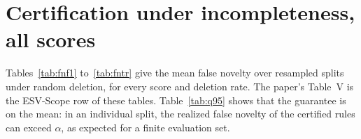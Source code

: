 \documentclass[10pt,a4paper]{article}
\theoremstyle{definition}
\theoremstyle{remark}
\newcommand{\open}{\textup{\textsc{open}}}
\newcommand{\closed}{\textup{\textsc{closed}}}
\begin{document}
\begin{table}[h]
\centering
\caption{The two passes over the SciFact test split (300 questions).}
\label{tab:runs}

\end{table}

\begin{table}[h]
\centering
\caption{Paired comparison on the test split, ESV-Learned minus baseline. $\Delta$F1 with paired bootstrap 95\% interval; McNemar counts of questions only ESV-Learned got right ($b$) and only the baseline got right ($c$).}
\label{tab:paired}

\end{table}

\begin{table}[h]
\centering
\caption{Further uncertified metrics on the test split. Wit.\ doc: share of quoted witness documents that are gold witnesses; Gr.\ rec.: share of \closed{} questions closed with a gold witness document; FC hard: share of hard-negative documents of \open{} questions that were used to close the question.}
\label{tab:unc}

\end{table}

\clearpage
\section{Certification under incompleteness, all scores}\label{sec:cert}

Tables~\ref{tab:fnf1} to~\ref{tab:fntr} give the mean false novelty over \SuppR{} resampled splits under random deletion, for every score and deletion rate. The paper's Table~V is the ESV-Scope row of these tables. Table~\ref{tab:q95} shows that the guarantee is on the mean: in an individual split, the realized false novelty of the certified rules can exceed $\alpha$, as expected for a finite evaluation set.

\begin{table}[h]
\centering
\caption{Mean false novelty, F1-optimal threshold, by deletion rate $p$.}
\label{tab:fnf1}

\end{table}

\begin{table}[h]
\centering
\caption{Mean false novelty, split conformal on the complete corpus.}
\label{tab:fnconf}

\end{table}

\begin{table}[h]
\centering
\caption{Mean false novelty, in-situ conformal (Theorem~1).}
\label{tab:fnin}

\end{table}
\end{document}
